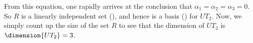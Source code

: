 %
From this equation, one rapidly arrives at the conclusion that $\alpha_1=\alpha_2=\alpha_3=0$.  So $R$ is a linearly independent set (), and hence is a basis () for $UT_2$.  Now, we simply count up the size of the set $R$ to see that the dimension of $UT_2$ is $\dimension{UT_2}=3$.